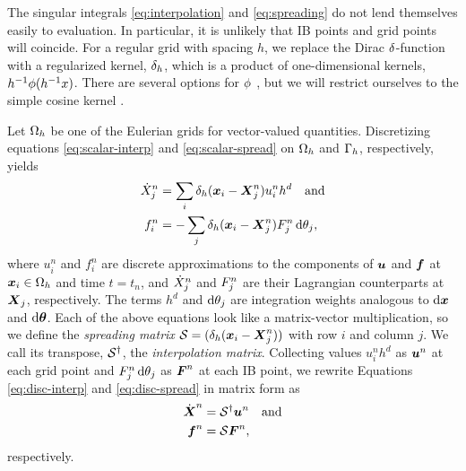 The singular integrals \eqref{eq:interpolation} and \eqref{eq:spreading} do not lend
themselves easily to evaluation. In particular, it is unlikely that IB points and grid
points will coincide. For a regular grid with spacing $h$, we replace the Dirac
$\delta$-function with a regularized kernel, $\delta_h$, which is a product of
one-dimensional kernels, $h^{-1}\phi(h^{-1}x)$. There are several options for
$\phi$ \cite{Griffith:2020hi}, but we will restrict ourselves to the simple cosine
kernel \cite{Peskin:2002go}.

Let $\Omega_h$ be one of the Eulerian grids for vector-valued quantities. Discretizing
equations \eqref{eq:scalar-interp} and \eqref{eq:scalar-spread} on $\Omega_h$ and
$\Gamma_h$, respectively, yields
\begin{align}
    \label{eq:disc-interp}
    \dot{X}^n_j &= \sum_i \delta_h(\x_i-\X^n_j)u^n_i h^d \quad \text{and} \\
    \label{eq:disc-spread}
    f^n_i &= -\sum_j \delta_h(\x_i-\X^n_j)F^n_j \d\theta_j,
\end{align}
where $u^n_i$ and $f^n_i$ are discrete approximations to the components of $\boldsymbol{u}$ and $\boldsymbol{f}$
at $\boldsymbol{x}_i\in\Omega_h$ and time $t=t_n$, and $\dot{X}^n_{\smash j}$ and $F^n_{\smash j}$
are their Lagrangian counterparts at $\boldsymbol{X}_{\smash j}$, respectively. The terms $h^d$ and
$\d\theta_{\smash j}$ are integration weights analogous to $\d\x$ and $\d\params$. Each
of the above equations look like a matrix-vector multiplication, so we define the
\emph{spreading matrix} $\mathcal{S}=(\delta_h(\boldsymbol{x}_i-\boldsymbol{X}^n_{\smash j}))$ with row $i$ and
column $j$. We call its transpose, $\mathcal{S}^\dagger$, the \emph{interpolation matrix}. Collecting
values $u^n_ih^d$ as $\boldsymbol{u}^n$ at each grid point and $F^n_{\smash j}\d\theta_{\smash j}$ as
$\boldsymbol{F}^n$ at each IB point, we rewrite Equations \eqref{eq:disc-interp} and
\eqref{eq:disc-spread} in matrix form as
\begin{align}
    \label{eq:matrix-interp}
    \dot{\boldsymbol{X}}^n &= \mathcal{S}^\dagger\boldsymbol{u}^n \quad\text{and} \\
    \label{eq:matrix-spread}
    \boldsymbol{f}^n &= \mathcal{S}\boldsymbol{F}^n,
\end{align}
respectively.

